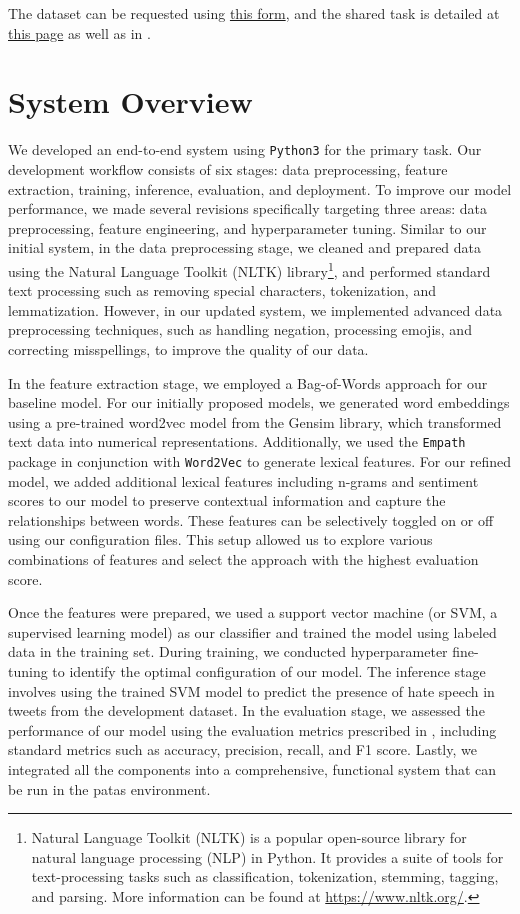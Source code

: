 \documentclass[11pt,a4paper]{article}
\begin{document}
   
      The dataset can be requested using \href{http://hatespeech.di.unito.it/hateval.html}{this form}, and the shared task is detailed at \href{https://competitions.codalab.org/competitions/19935#learn_the_details-overview}{this page} as well as in \citet{basile-etal-2019-semeval}.


\section{System Overview}
We developed an end-to-end system using \verb|Python3| for the primary task. Our development workflow consists of six stages: data preprocessing, feature extraction, training, inference, evaluation, and deployment. To improve our model performance, we made several revisions specifically targeting three areas: data preprocessing, feature engineering, and hyperparameter tuning. Similar to our initial system, in the data preprocessing stage, we cleaned and prepared data using the Natural Language Toolkit (NLTK) library\footnote{Natural Language Toolkit (NLTK) is a popular open-source library for natural language processing (NLP) in Python. It provides a suite of tools for text-processing tasks such as classification, tokenization, stemming, tagging, and parsing. More information can be found at \url{https://www.nltk.org/}.}, and performed standard text processing such as removing special characters, tokenization, and lemmatization. However, in our updated system, we implemented advanced data preprocessing techniques, such as handling negation, processing emojis, and correcting misspellings, to improve the quality of our data.

  In the feature extraction stage, we employed a Bag-of-Words approach for our baseline model. For our initially proposed models, we generated word embeddings using a pre-trained word2vec model from the Gensim library, which transformed text data into numerical representations. Additionally, we used the \verb|Empath| package in conjunction with \verb|Word2Vec| to generate lexical features. For our refined model, we added additional lexical features including n-grams and sentiment scores to our model to preserve contextual information and capture the relationships between words. These features can be selectively toggled on or off using our configuration files. This setup allowed us to explore various combinations of features and select the approach with the highest evaluation score.
  
   Once the features were prepared, we used a support vector machine (or SVM, a supervised learning model) as our classifier and trained the model using labeled data in the training set. During training, we conducted hyperparameter fine-tuning to identify the optimal configuration of our model. The inference stage involves using the trained SVM model to predict the presence of hate speech in tweets from the development dataset. In the evaluation stage, we assessed the performance of our model using the evaluation metrics prescribed in \citet{basile-etal-2019-semeval}, including standard metrics such as accuracy, precision, recall, and F1 score. Lastly, we integrated all the components into a comprehensive, functional system that can be run in the patas environment.
   
\end{document}
